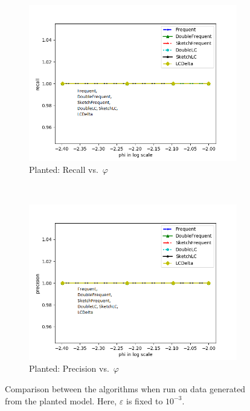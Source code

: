 \documentclass[sigconf,review=true,anonymous=true,screen]{acmart}
\newcommand{\eps}{\varepsilon}
\renewcommand{\phi}{\varphi}
\begin{document}
\begin{figure}[!t]
\begin{subfigure}[b]{0.33\textwidth}
\includegraphics[width=\textwidth]{../Plots/recall_phi.png}
\caption{Planted: Recall vs.~$\phi$}
\label{fig:plrecphi}
\end{subfigure}
~
\begin{subfigure}[b]{0.33\textwidth}
\includegraphics[width=\textwidth]{../Plots/precision_phi.png}
\caption{Planted: Precision vs.~$\phi$}
\label{fig:plprephi}
\end{subfigure}
\caption{Comparison between the algorithms when run on data generated from the planted model. Here, $\eps$ is fixed to $10^{-3}$.}
\label{fig:fixeps}
\end{figure}
\end{document}

